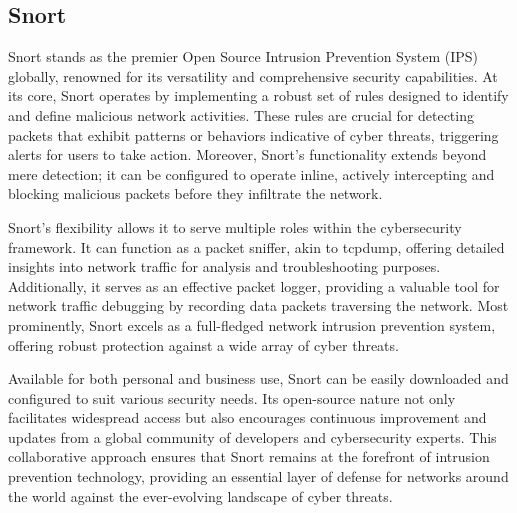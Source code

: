 \subsection{Snort}
\vspace{-18pt}
Snort stands as the premier Open Source Intrusion Prevention System (IPS) globally, renowned for its versatility and comprehensive security capabilities. At its core, Snort operates by implementing a robust set of rules designed to identify and define malicious network activities. These rules are crucial for detecting packets that exhibit patterns or behaviors indicative of cyber threats, triggering alerts for users to take action. Moreover, Snort's functionality extends beyond mere detection; it can be configured to operate inline, actively intercepting and blocking malicious packets before they infiltrate the network.\par 
Snort's flexibility allows it to serve multiple roles within the cybersecurity framework. It can function as a packet sniffer, akin to tcpdump, offering detailed insights into network traffic for analysis and troubleshooting purposes. Additionally, it serves as an effective packet logger, providing a valuable tool for network traffic debugging by recording data packets traversing the network. Most prominently, Snort excels as a full-fledged network intrusion prevention system, offering robust protection against a wide array of cyber threats.\par 
Available for both personal and business use, Snort can be easily downloaded and configured to suit various security needs. Its open-source nature not only facilitates widespread access but also encourages continuous improvement and updates from a global community of developers and cybersecurity experts. This collaborative approach ensures that Snort remains at the forefront of intrusion prevention technology, providing an essential layer of defense for networks around the world against the ever-evolving landscape of cyber threats.
\vspace{-10pt}
